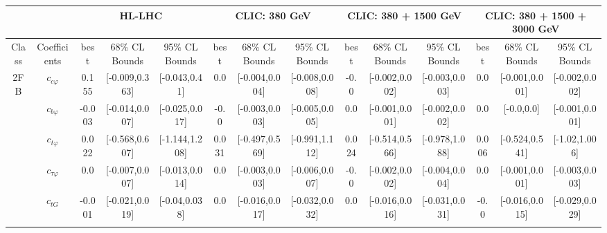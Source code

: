 \documentclass{article}
\begin{document}
\begin{table}[H]
\centering
\begin{tabular}{|c|c|c|c|c|c|c|c|c|c|c|c|c|c|}
\hline
 &  & \multicolumn{3}{c|}{HL-LHC} & \multicolumn{3}{c|}{CLIC: 380 GeV} & \multicolumn{3}{c|}{CLIC: 380 + 1500 GeV} & \multicolumn{3}{c|}{CLIC: 380 + 1500 + 3000 GeV} \\ \hline
Class & Coefficients & best & 68\% CL Bounds & 95\% CL Bounds & best & 68\% CL Bounds & 95\% CL Bounds & best & 68\% CL Bounds & 95\% CL Bounds & best & 68\% CL Bounds & 95\% CL Bounds\\ \hline
\multirow{23}{*}{2FB}
 & $c_{c \varphi}$ & 0.155                             & [-0.009,0.363]                                 & [-0.043,0.41] & 0.0                             & [-0.004,0.004]                                 & [-0.008,0.008] & -0.0                             & [-0.002,0.002]                                 & [-0.003,0.003] & 0.0                             & [-0.001,0.001]                                 & [-0.002,0.002] \\ \cline{2-14}
 & $c_{b \varphi}$ & -0.003                             & [-0.014,0.007]                                 & [-0.025,0.017] & -0.0                             & [-0.003,0.003]                                 & [-0.005,0.005] & 0.0                             & [-0.001,0.001]                                 & [-0.002,0.002] & 0.0                             & [-0.0,0.0]                                 & [-0.001,0.001] \\ \cline{2-14}
 & $c_{t \varphi}$ & 0.022                             & [-0.568,0.607]                                 & [-1.144,1.208] & 0.031                             & [-0.497,0.569]                                 & [-0.991,1.112] & 0.024                             & [-0.514,0.566]                                 & [-0.978,1.088] & 0.006                             & [-0.524,0.541]                                 & [-1.02,1.006] \\ \cline{2-14}
 & $c_{\tau \varphi}$ & 0.0                             & [-0.007,0.007]                                 & [-0.013,0.014] & 0.0                             & [-0.003,0.003]                                 & [-0.006,0.007] & -0.0                             & [-0.002,0.002]                                 & [-0.004,0.004] & 0.0                             & [-0.001,0.001]                                 & [-0.003,0.003] \\ \cline{2-14}
 & $c_{tG}$ & -0.001                             & [-0.021,0.019]                                 & [-0.04,0.038] & 0.0                             & [-0.016,0.017]                                 & [-0.032,0.032] & 0.0                             & [-0.016,0.016]                                 & [-0.031,0.031] & -0.0                             & [-0.016,0.015]                                 & [-0.029,0.029] \\ \cline{2-14}

\end{tabular}
\end{table}
\end{document}
